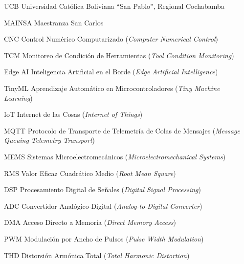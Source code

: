 
%
%

            {UCB}
            {Universidad Católica Boliviana ``San Pablo'', Regional Cochabamba}

            {MAINSA}
            {Maestranza San Carlos}

            {CNC}
            {Control Numérico Computarizado (\textit{Computer Numerical Control})}

            {TCM}
            {Monitoreo de Condición de Herramientas (\textit{Tool Condition Monitoring})}

            {Edge AI}
            {Inteligencia Artificial en el Borde (\textit{Edge Artificial Intelligence})}

            {TinyML}
            {Aprendizaje Automático en Microcontroladores (\textit{Tiny Machine Learning})}

            {IoT}
            {Internet de las Cosas (\textit{Internet of Things})}

            {MQTT}
            {Protocolo de Transporte de Telemetría de Colas de Mensajes (\textit{Message Queuing Telemetry Transport})}

            {MEMS}
            {Sistemas Microelectromecánicos (\textit{Microelectromechanical Systems})}

            {RMS}
            {Valor Eficaz Cuadrático Medio (\textit{Root Mean Square})}

            {DSP}
            {Procesamiento Digital de Señales (\textit{Digital Signal Processing})}

            {ADC}
            {Convertidor Analógico-Digital (\textit{Analog-to-Digital Converter})}

            {DMA}
            {Acceso Directo a Memoria (\textit{Direct Memory Access})}

            {PWM}
            {Modulación por Ancho de Pulsos (\textit{Pulse Width Modulation})}

            {THD}
            {Distorsión Armónica Total (\textit{Total Harmonic Distortion})}

